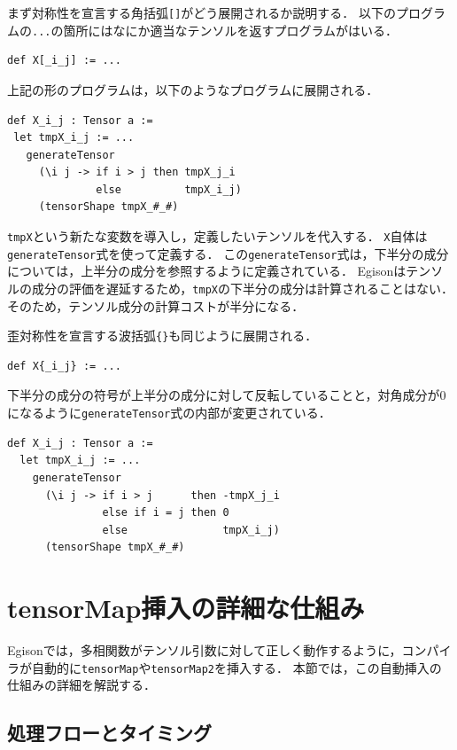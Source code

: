 まず対称性を宣言する角括弧\lstinline|[]|がどう展開されるか説明する．
以下のプログラムの\lstinline{...}の箇所にはなにか適当なテンソルを返すプログラムがはいる．
\begin{lstlisting}[language=egison,numbers=none]
def X[_i_j] := ...
\end{lstlisting}
上記の形のプログラムは，以下のようなプログラムに展開される．
\begin{lstlisting}[language=egison,numbers=none]
def X_i_j : Tensor a :=
 let tmpX_i_j := ...
   generateTensor
     (\i j -> if i > j then tmpX_j_i
              else          tmpX_i_j)
     (tensorShape tmpX_#_#)
\end{lstlisting}
\lstinline{tmpX}という新たな変数を導入し，定義したいテンソルを代入する．
\lstinline{X}自体は\lstinline{generateTensor}式を使って定義する．
この\lstinline{generateTensor}式は，下半分の成分については，上半分の成分を参照するように定義されている．
Egisonはテンソルの成分の評価を遅延するため，\lstinline{tmpX}の下半分の成分は計算されることはない．
そのため，テンソル成分の計算コストが半分になる．

歪対称性を宣言する波括弧\lstinline|{}|も同じように展開される．
\begin{lstlisting}[language=egison,numbers=none]
def X{_i_j} := ...
\end{lstlisting}
下半分の成分の符号が上半分の成分に対して反転していることと，対角成分が$0$になるように\lstinline{generateTensor}式の内部が変更されている．
\begin{lstlisting}[language=egison,numbers=none]
def X_i_j : Tensor a :=
  let tmpX_i_j := ...
    generateTensor
      (\i j -> if i > j      then -tmpX_j_i
               else if i = j then 0
               else               tmpX_i_j)
      (tensorShape tmpX_#_#)
\end{lstlisting}

\section{tensorMap挿入の詳細な仕組み}

Egisonでは，多相関数がテンソル引数に対して正しく動作するように，コンパイラが自動的に\lstinline{tensorMap}や\lstinline{tensorMap2}を挿入する．
本節では，この自動挿入の仕組みの詳細を解説する．

\subsection{処理フローとタイミング}

